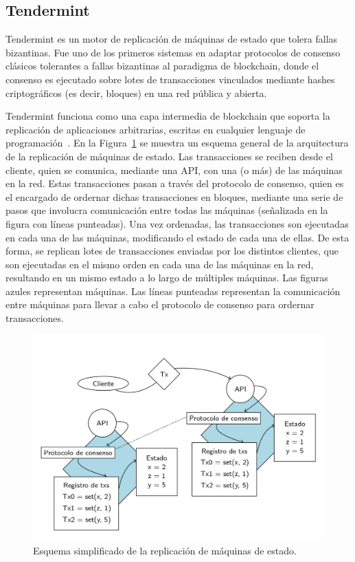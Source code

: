 \subsection{Tendermint}\label{sec:tendermint}
Tendermint es un motor de replicación de máquinas de estado que tolera fallas bizantinas.
%
Fue uno de los primeros sistemas en adaptar protocolos de consenso clásicos tolerantes a fallas bizantinas
al paradigma de blockchain, donde el consenso es ejecutado sobre lotes de transacciones vinculados mediante
hashes criptográficos (es decir, bloques) en una red pública y abierta.

%

Tendermint funciona como una capa intermedia de blockchain que soporta la replicación de aplicaciones arbitrarias,
escritas en cualquier lenguaje de programación~\cite{tendermint.design}.
%
En la Figura~\ref{fig:replication} se muestra un esquema general de la arquitectura de la replicación de máquinas de
estado.
%
Las transacciones se reciben desde el cliente, quien se comunica, mediante una API, con una (o más) de las máquinas
en la red.
%
Estas transacciones pasan a través del protocolo de consenso, quien es el encargado de ordernar dichas
transacciones en bloques, mediante una serie de pasos que involucra comunicación entre todas las máquinas
(señalizada en la figura con líneas punteadas).
%
Una vez ordenadas, las transacciones son ejecutadas en cada una de las máquinas, modificando el estado
de cada una de ellas.
%
De esta forma, se replican lotes de transacciones enviadas por los distintos clientes, que son ejecutadas en el mismo
orden en cada una de las máquinas en la red, resultando en un mismo estado a lo largo de múltiples máquinas.
%
Las figuras azules representan máquinas.
%
Las líneas punteadas representan la comunicación entre máquinas para llevar a cabo el protocolo de consenso para ordernar
transacciones.

\begin{figure}
  \centering
  \includegraphics[scale=0.3]{figures/state-machine-replication.png}
  \caption{Esquema simplificado de la replicación de máquinas de estado.}
  \label{fig:replication}
\end{figure}

